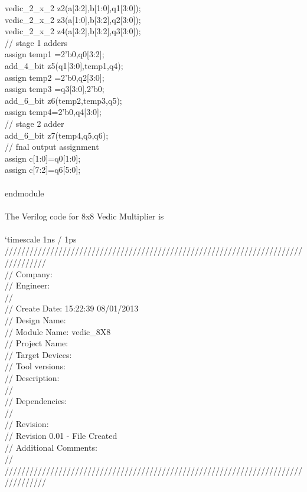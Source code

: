 vedic\_2\_x\_2 z2(a[3:2],b[1:0],q1[3:0]);\\
vedic\_2\_x\_2 z3(a[1:0],b[3:2],q2[3:0]);\\
vedic\_2\_x\_2 z4(a[3:2],b[3:2],q3[3:0]);\\
// stage 1 adders \\
assign temp1 ={2'b0,q0[3:2]};\\
add\_4\_bit z5(q1[3:0],temp1,q4);\\
assign temp2 ={2'b0,q2[3:0]};\\
assign temp3 ={q3[3:0],2'b0};\\
add\_6\_bit z6(temp2,temp3,q5);\\
assign temp4={2'b0,q4[3:0]};\\
// stage 2 adder \\
add\_6\_bit z7(temp4,q5,q6);\\
// fnal output assignment \\
assign c[1:0]=q0[1:0];\\
assign c[7:2]=q6[5:0];\\
\\
endmodule\\
\\
The Verilog code for 8x8 Vedic Multiplier is\\
\\
`timescale 1ns / 1ps \\
//////////////////////////////////////////////////////////////////////////////////\\
// Company: \\
// Engineer: \\
// \\
// Create Date:    15:22:39 08/01/2013 \\
// Design Name: \\
// Module Name:    vedic\_8X8 \\
// Project Name: \\
// Target Devices: \\
// Tool versions: \\
// Description: \\
//\\
// Dependencies: \\
//\\
// Revision: \\
// Revision 0.01 - File Created\\
// Additional Comments: \\
//\\
//////////////////////////////////////////////////////////////////////////////////\\
